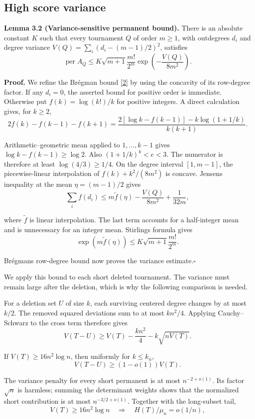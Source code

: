 \documentclass[11pt,a4paper]{article}
\makeatletter
\newcommand{\paperstatement}[3]{\par\addvspace{6pt}\Needspace{4\baselineskip}\phantomsection\def\@currentlabel{#2}\label{#3}\noindent\textbf{#1}\enspace}
\newcommand{\paperref}[2]{\hyperref[#1]{#2}}
\makeatother
\begin{document}
\subsection{High score variance}\label{sec-3.2}

\paperstatement{Lemma 3.2 (Variance-sensitive permanent bound).}{3.2}{thm-3.2} There is an absolute constant \(K\) such that every tournament \(Q\) of order \(m\ge1\), with outdegrees \(d_i\) and degree variance \(V(Q)=\sum_i(d_i-(m-1)/2)^2\), satisfies
\[\operatorname{per}A_Q\le
K\sqrt{m+1}\frac{m!}{2^m}\exp\left(-\frac{V(Q)}{8m^2}\right).\]

\textbf{Proof.} We refine the Brégman bound \paperref{bib-2}{[2]} by using the concavity of its row-degree factor. If any \(d_i=0\), the asserted bound for positive order is immediate. Otherwise put \(f(k)=\log(k!)/k\) for positive integers. A direct calculation gives, for \(k\ge2\),
\[2f(k)-f(k-1)-f(k+1)
=\frac{2[\log k-f(k-1)]-k\log(1+1/k)}{k(k+1)}.\]

Arithmetic--geometric mean applied to \(1,\ldots,k-1\) gives \(\log k-f(k-1)\ge\log2\). Also \((1+1/k)^k<e<3\). The numerator is therefore at least \(\log(4/3)\ge1/4\). On the degree interval \([1,m-1]\), the piecewise-linear interpolation of \(f(k)+k^2/(8m^2)\) is concave. Jensen\textquotesingle s inequality at the mean \(\eta=(m-1)/2\) gives
\[\sum_i f(d_i)
\le m\widetilde f(\eta)-\frac{V(Q)}{8m^2}+\frac{1}{32m},\]

where \(\widetilde f\) is linear interpolation. The last term accounts for a half-integer mean and is unnecessary for an integer mean. Stirling\textquotesingle s formula gives
\[\exp(m\widetilde f(\eta))\le K\sqrt{m+1}\frac{m!}{2^m}.\]

Brégman\textquotesingle s row-degree bound now proves the variance estimate.\nobreak\hspace{.5em}\mbox{$\square$}

We apply this bound to each short deleted tournament. The variance must remain large after the deletion, which is why the following comparison is needed.

For a deletion set \(U\) of size \(k\), each surviving centered degree changes by at most \(k/2\). The removed squared deviations sum to at most \(kn^2/4\). Applying Cauchy--Schwarz to the cross term therefore gives
\[V(T-U)\ge V(T)-\frac{kn^2}{4}-k\sqrt{nV(T)}.\]

If \(V(T)\ge16n^2\log n\), then uniformly for \(k\le k_n\),
\[V(T-U)\ge(1-o(1))V(T).\]

The variance penalty for every short permanent is at most \(n^{-2+o(1)}\). Its factor \(\sqrt n\) is harmless; summing the determinant weights shows that the normalized short contribution is at most \(n^{-3/2+o(1)}\). Together with the long-subset tail,
\[V(T)\ge16n^2\log n\quad\Longrightarrow\quad
H(T)/\mu_n=o(1/n),\]
\end{document}
